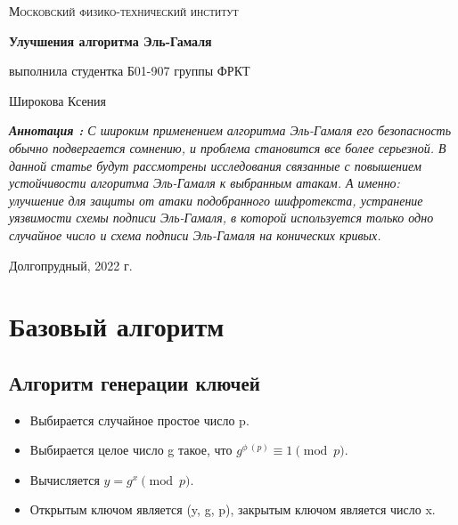 \documentclass[a4paper]{article}
\begin{document}
\begin{titlepage}
	\centering
	\vspace{5cm}
	{\scshape\LARGE Московский физико-технический институт \par}
	\vspace{4cm}
	{\huge\bfseries Улучшения алгоритма Эль-Гамаля \par}
	\vspace{1cm}

	{\large выполнила студентка Б01-907 группы ФРКТ}\par
	\vspace{0.3cm}
	{\LARGE Широкова Ксения\par}\par
	\vspace{1cm}
\textit{\textbf{Аннотация : } С широким применением алгоритма Эль-Гамаля его безопасность обычно подвергается сомнению, и проблема становится все более серьезной. В данной статье будут рассмотрены исследования связанные с повышением устойчивости алгоритма Эль-Гамаля к выбранным атакам. А именно: улучшение для защиты от атаки подобранного шифротекста, устранение уязвимости схемы подписи Эль-Гамаля, в которой используется только одно случайное число и схема подписи Эль-Гамаля на конических кривых.
}
	\vfill

	Долгопрудный, 2022 г.
\end{titlepage}

\section*{Базовый алгоритм}
\subsection*{Алгоритм генерации ключей}

\begin{itemize}
    \item Выбирается случайное простое число p.
    \item Выбирается целое число g такое, что ${g^{\phi\ (p)}\equiv 1{\pmod {p}}}$.
    \item Вычисляется ${ y=g^{x}{\pmod {p}}}$.
    \item Открытым ключом является (y, g, p), закрытым ключом является число x.
\end{itemize}
\end{document}
